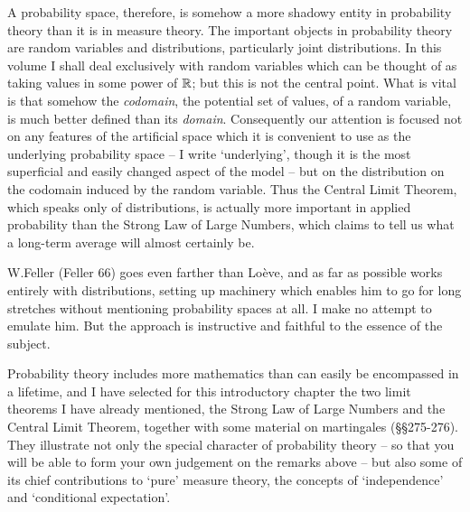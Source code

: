A probability space, therefore, is somehow a more shadowy entity in 
probability theory than it is in measure theory.   The important objects 
in probability theory are random variables and distributions, 
particularly joint distributions.   In this volume I shall deal 
exclusively with random variables which can be thought of as 
taking values in some power of $\Bbb R$;  but this is not the central 
point.   What is vital is that somehow the {\it codomain}, the potential 
set of values, of a random variable, is much better defined than its 
{\it domain}.   Consequently our attention is focused not on any 
features of the artificial space which it is convenient to use as the 
underlying probability space -- I write `underlying', though 
it is the most superficial and easily changed aspect of the model 
-- but on the distribution on the codomain induced by the random 
variable.   Thus the Central Limit Theorem, which speaks only of 
distributions, is actually more important in applied probability than 
the Strong Law of Large Numbers, which claims to tell us what a 
long-term average will almost certainly be. 
 
W.Feller ({\smc Feller 66}) goes even farther than Lo\`eve, and as 
far as 
possible works entirely with distributions, setting up machinery which 
enables him to go for long stretches without mentioning probability 
spaces at all.   I make no attempt to emulate him.   But the approach is 
instructive and faithful to the essence of the subject. 
 
Probability theory includes more mathematics than can easily be 
encompassed in a lifetime, and I have selected for this introductory 
chapter the two limit theorems I have already mentioned, the Strong Law 
of Large Numbers and the Central Limit Theorem,  
together with some material on martingales (\S\S275-276).    
They illustrate not 
only the special character of probability theory -- so that you will be 
able to form your own judgement on the remarks above -- but also some of  
its chief contributions to `pure' measure theory, the concepts of  
`independence' and `conditional expectation'. 
 
 
\discrpage 
 
